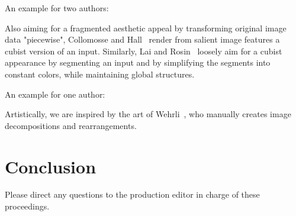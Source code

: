An example for two authors: 

Also aiming for a fragmented aesthetic appeal by transforming original image data "piecewise", Collomosse and Hall~\cite{collomosse_2003_csr} render from salient image features a cubist version of an input. Similarly, Lai and Rosin~\cite{lai_2013_are} loosely aim for a cubist appearance by segmenting an input and by simplifying the segments into constant colors, while maintaining global structures.

An example for one author: 

Artistically, we are inspired by the art of Wehrli~\cite{wehrli_2003_tau}, who manually creates image decompositions and rearrangements.

\section{Conclusion}

Please direct any questions to the production editor in charge of
these proceedings.



%







